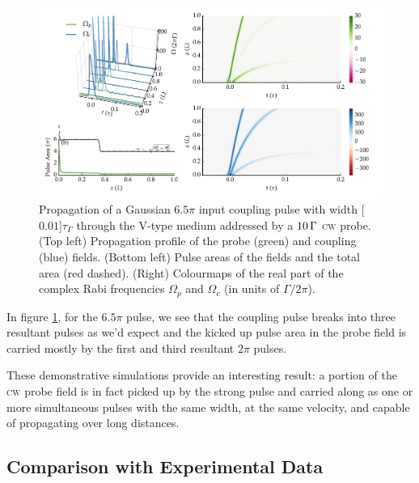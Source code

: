     \begin{figure}[h]
    \includegraphics[width=\linewidth]
      {figs/06_simultons/mb_vee_sit_plot_65pi_Ng1e4_fig1.pdf}
    \caption{
    Propagation of a Gaussian $6.5 \pi$ input coupling pulse with width
    \unit[$0.01$]{$\tau_\Gamma$} through the V-type medium addressed by a
    $\unit[10]{\Gamma}$ \textsc{cw} probe. (Top left) Propagation profile of the
    probe (green) and coupling (blue) fields. (Bottom left) Pulse areas of the
    fields and the total area (red dashed). (Right) Colourmaps of the real part
    of the complex Rabi frequencies $\Omega_{p}$ and $\Omega_{c}$ (in units of
    $\Gamma/2\pi$).
    }
    \label{fig:pulse_cw_6pi_cmap}
    \end{figure}

    In figure \ref{fig:pulse_cw_6pi_cmap}, for the $6.5 \pi$ pulse, we see that
    the coupling pulse breaks into three resultant pulses as we'd expect and the
    kicked up pulse area in the probe field is carried mostly by the first and
    third resultant $2 \pi$ pulses.

    These demonstrative simulations provide an interesting result: a portion of
    the \textsc{cw} probe field is in fact picked up by the strong pulse and
    carried along as one or more simultaneous pulses with the same width, at the
    same velocity, and capable of propagating over long distances.

  \subsection{Comparison with Experimental Data}

